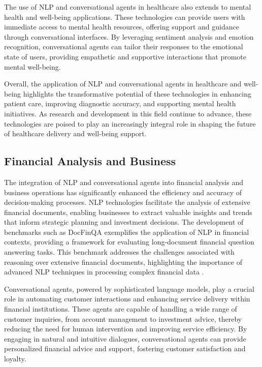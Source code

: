 The use of NLP and conversational agents in healthcare also extends to mental health and well-being applications. These technologies can provide users with immediate access to mental health resources, offering support and guidance through conversational interfaces. By leveraging sentiment analysis and emotion recognition, conversational agents can tailor their responses to the emotional state of users, providing empathetic and supportive interactions that promote mental well-being.



Overall, the application of NLP and conversational agents in healthcare and well-being highlights the transformative potential of these technologies in enhancing patient care, improving diagnostic accuracy, and supporting mental health initiatives. As research and development in this field continue to advance, these technologies are poised to play an increasingly integral role in shaping the future of healthcare delivery and well-being support.



\subsection{Financial Analysis and Business} \label{subsec:Financial Analysis and Business}

The integration of NLP and conversational agents into financial analysis and business operations has significantly enhanced the efficiency and accuracy of decision-making processes. NLP technologies facilitate the analysis of extensive financial documents, enabling businesses to extract valuable insights and trends that inform strategic planning and investment decisions. The development of benchmarks such as DocFinQA exemplifies the application of NLP in financial contexts, providing a framework for evaluating long-document financial question answering tasks. This benchmark addresses the challenges associated with reasoning over extensive financial documents, highlighting the importance of advanced NLP techniques in processing complex financial data \cite{reddy2024docfinqalongcontextfinancialreasoning}.



Conversational agents, powered by sophisticated language models, play a crucial role in automating customer interactions and enhancing service delivery within financial institutions. These agents are capable of handling a wide range of customer inquiries, from account management to investment advice, thereby reducing the need for human intervention and improving service efficiency. By engaging in natural and intuitive dialogues, conversational agents can provide personalized financial advice and support, fostering customer satisfaction and loyalty.



